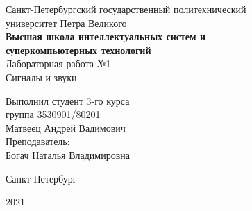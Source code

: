 \documentclass[a4paper]{article}
\begin{document}
    \begin{center}
        \begin{center}
        \hfill \break
        \normalsize{Санкт-Петербургский государственный политехнический}\\
        \normalsize{университет Петра Великого}\\
        \hfill \break
        \normalsize{\textbf{Высшая школа интеллектуальных систем и}}\\ 
        \normalsize{\textbf{суперкомпьютерных технологий}}\\ 
        \hfill \break
        \hfill \break
        \hfill \break
        \normalsize{Лабораторная работа №1}\\
        \hfill \break
        \hfill \break
        \normalsize{\LARGE Сигналы и звуки}\\
        \end{center}
        \hfill \break
        \hfill \break
        \hfill \break
        \hfill \break
        \hfill \break
        \hfill \break
        \hfill \break
        \hfill \break
        \hfill \break
        \hfill \break
        \begin{flushright}
            \normalsize{Выполнил студент 3-го курса}\\
            \normalsize{группа 3530901/80201}\\
            \normalsize{Матвеец Андрей Вадимович}\\
            \hfill \break
            \normalsize{Преподаватель:}\\
            \normalsize{Богач Наталья Владимировна}\\
        \end{flushright}
        \hfill \break
        \hfill \break
        \hfill \break
        \hfill \break
        \begin{center} Санкт-Петербург\end{center}
        \begin{center}2021\end{center} 
        \thispagestyle{empty}
    \end{center}
    
    \newpage
        \tableofcontents
    
    \newpage
         \listoffigures
    
    \newpage
         \lstlistoflistings   
     
\end{document}
